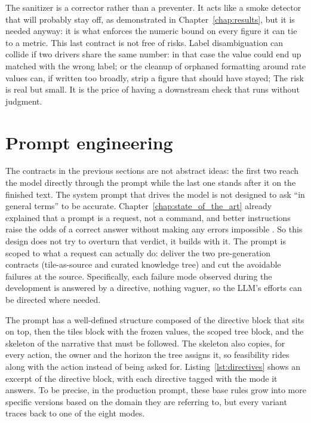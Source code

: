 \documentclass[12pt,a4paper,openright,twoside]{book}
\begin{document}
  The sanitizer is a corrector rather than a preventer. 
  It acts like a smoke detector that will probably stay off, as demonstrated in Chapter~\ref{chap:results}, but it is needed anyway: it is what enforces the numeric bound on every figure it can tie to a metric.
  This last contract is not free of risks.
  Label disambiguation can collide if two drivers share the same number: in that case the value could end up matched with the wrong label; or the cleanup of orphaned formatting around rate values can, if written too broadly, strip a figure that should have stayed;
  The risk is real but small. It is the price of having a downstream check that runs without judgment.

  
  \section{Prompt engineering}
  \label{sec:promptengineering}

The contracts in the previous sections are not abstract ideas: the first two reach the model directly through the prompt while the last one stands after it on the finished text.
The system prompt that drives the model is not designed to ask \enquote{in general terms} to be accurate.
Chapter~\ref{chap:state_of_the_art} already explained that a prompt is a request, not a command, and better instructions raise the odds of a correct answer without making any errors impossible \cite{wei2022cot}.
So this design does not try to overturn that verdict, it builds with it.
The prompt is scoped to what a request can actually do: deliver the two pre-generation contracts (tile-as-source and curated knowledge tree) and cut the avoidable failures at the source.
Specifically, each failure mode observed during the development is answered by a directive, nothing vaguer, so the \ac{LLM}'s efforts can be directed where needed.


The prompt has a well-defined structure composed of the directive block that sits on top, then the tiles block with the frozen values, the scoped tree block, and the skeleton of the narrative that must be followed.
The skeleton also copies, for every action, the owner and the horizon the tree assigns it, so feasibility rides along with the action instead of being asked for.
Listing~\ref{lst:directives} shows an excerpt of the directive block, with each directive tagged with the mode it answers.
To be precise, in the production prompt, these base rules grow into more specific versions based on the domain they are referring to, but every variant traces back to one of the eight modes.
\end{document}
